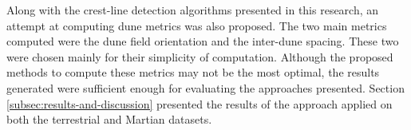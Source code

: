 Along with the crest-line detection algorithms presented in this research, an attempt at computing dune metrics was also proposed. The two main metrics computed were the dune field orientation and the inter-dune spacing. These two were chosen mainly for their simplicity of computation. Although the proposed methods to compute these metrics may not be the most optimal, the results generated were sufficient enough for evaluating the approaches presented. Section \ref{subsec:results-and-discussion} presented the results of the approach applied on both the terrestrial and Martian datasets.
%

